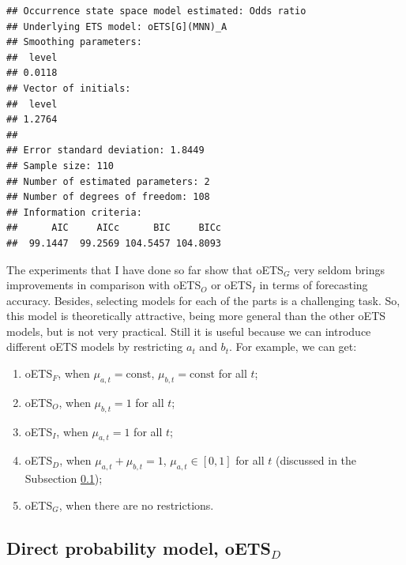 \documentclass[
]{book}
\providecommand{\tightlist}{%
  \setlength{\itemsep}{0pt}\setlength{\parskip}{0pt}}
\theoremstyle{definition}
\theoremstyle{definition}
\theoremstyle{definition}
\theoremstyle{definition}
\theoremstyle{remark}
\begin{document}
\begin{verbatim}
## Occurrence state space model estimated: Odds ratio
## Underlying ETS model: oETS[G](MNN)_A
## Smoothing parameters:
##  level 
## 0.0118 
## Vector of initials:
##  level 
## 1.2764 
## 
## Error standard deviation: 1.8449
## Sample size: 110
## Number of estimated parameters: 2
## Number of degrees of freedom: 108
## Information criteria: 
##      AIC     AICc      BIC     BICc 
##  99.1447  99.2569 104.5457 104.8093
\end{verbatim}

The experiments that I have done so far show that oETS\(_G\) very seldom brings improvements in comparison with oETS\(_O\) or oETS\(_I\) in terms of forecasting accuracy. Besides, selecting models for each of the parts is a challenging task. So, this model is theoretically attractive, being more general than the other oETS models, but is not very practical. Still it is useful because we can introduce different oETS models by restricting \(a_t\) and \(b_t\). For example, we can get:

\begin{enumerate}
\def\labelenumi{\arabic{enumi}.}
\tightlist
\item
  oETS\(_F\), when \(\mu_{a,t} = \text{const}\), \(\mu_{b,t} = \text{const}\) for all \(t\);
\item
  oETS\(_O\), when \(\mu_{b,t} = 1\) for all \(t\);
\item
  oETS\(_I\), when \(\mu_{a,t} = 1\) for all \(t\);
\item
  oETS\(_D\), when \(\mu_{a,t} + \mu_{b,t} = 1\), \(\mu_{a,t} \in [0,1]\) for all \(t\) (discussed in the Subsection \ref{oETSD});
\item
  oETS\(_G\), when there are no restrictions.
\end{enumerate}

\hypertarget{oETSD}{%
\subsection{\texorpdfstring{Direct probability model, oETS\(_D\)}{Direct probability model, oETS\_D}}\label{oETSD}}
\end{document}
